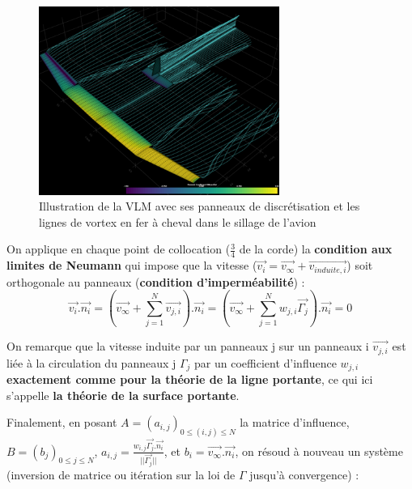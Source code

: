 \begin{figure}[H]
    \centering
    \includegraphics[width=0.7\textwidth]{Pics/01 - Basses Fidélités/vlm.png}
    \caption{Illustration de la VLM avec ses panneaux de discrétisation et les lignes de vortex en fer à cheval dans le sillage de l'avion}
    \label{fig:vlm}
\end{figure}

On applique en chaque point de collocation ($\frac{3}{4}$ de la corde) la \textbf{condition aux limites de Neumann} qui impose que la vitesse ($\overrightarrow{v_i} = \overrightarrow{v_{\infty}} + \overrightarrow{v_{induite,i}}$) soit orthogonale au panneaux (\textbf{condition d'imperméabilité}) :
\begin{equation}
    \overrightarrow{v_i}.\overrightarrow{n_i} = (\overrightarrow{v_{\infty}} + \sum_{j =1}^{N}\overrightarrow{v_{j,i}}).\overrightarrow{n_i} = (\overrightarrow{v_{\infty}} + \sum_{j =1}^{N}w_{j,i}\overrightarrow{\Gamma_j}).\overrightarrow{n_i} = 0
    \label{eq: Neumann boundary}
\end{equation}

On remarque que la vitesse induite par un panneaux j sur un panneaux i $\overrightarrow{v_{j,i}}$ est liée à la circulation du panneaux j $\Gamma_j$ par un coefficient d'influence $w_{j,i}$ \textbf{exactement comme pour la théorie de la ligne portante}, ce qui ici s'appelle \textbf{la théorie de la surface portante}.

Finalement, en posant $A = (a_{i,j})_{0 \leq (i,j) \leq N}$ la matrice d'influence, $B = (b_{j})_{0 \leq j \leq N}$, $a_{i,j} = \frac{w_{i,j}\overrightarrow{\Gamma_j}.\overrightarrow{n_i}}{||\overrightarrow{\Gamma_j}||}$, et $b_{i} = \overrightarrow{v_{\infty}}.\overrightarrow{n_i}$, on résoud à nouveau un système (inversion de matrice ou itération sur la loi de $\Gamma$ jusqu'à convergence) :

